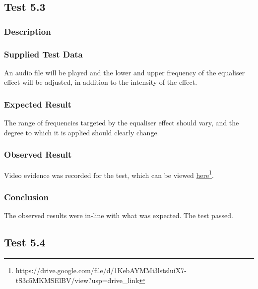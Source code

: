 \pagebreak
\subsection{Test 5.3}
\subsubsection*{Description}
\paragraph{}
{
	\centering
}

\subsubsection*{Supplied Test Data}
An audio file will be played and the lower and upper frequency of the equaliser effect will be adjusted, in addition to the intensity of the effect.

\subsubsection*{Expected Result}
The range of frequencies targeted by the equaliser effect should vary, and the degree to which it is applied should clearly change.

\subsubsection*{Observed Result}
\label{sec:evidence5.3}
Video evidence was recorded for the test, which can be viewed \href{https://drive.google.com/file/d/1KebAYMMi3lstsluiX7-tS3c5MKMSElBV/view?usp=drive_link}{here}\footnote{
	https://drive.google.com/file/d/1KebAYMMi3lstsluiX7-tS3c5MKMSElBV/view?usp=drive\_link
}.

\subsubsection*{Conclusion}
The observed results were in-line with what was expected. The test passed.


\pagebreak
\subsection{Test 5.4}
